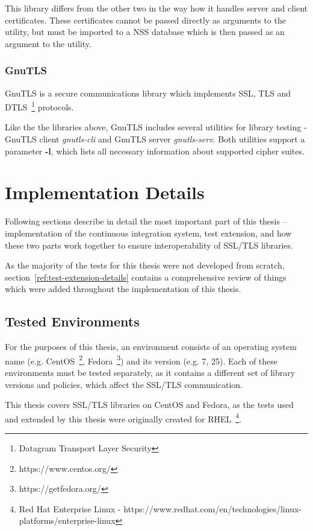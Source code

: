     This library differs from the other two in the way how it handles
    server and client certificates. These certificates cannot be passed
    directly as arguments to the utility, but must be imported to a NSS
    database which is then passed as an argument to the utility.

\subsection{GnuTLS}
    GnuTLS is a secure communications library which implements SSL, TLS and
    DTLS~\footnote{Datagram Transport Layer Security} protocols.

    Like the the libraries above, GnuTLS includes several utilities for library
    testing - GnuTLS client \textit{gnutls-cli} and GnuTLS server
    \textit{gnutls-serv}. Both utilities support a parameter \textbf{-l},
    which lists all necessary information about supported cipher suites.


\chapter{Implementation Details}
    Following sections describe in detail the most important part of this thesis
    -- implementation of the continuous integration system, test extension,
    and how these two parts work together to ensure interoperability of
    SSL/TLS libraries.

    As the majority of the tests for this thesis were not developed from scratch,
    section~\ref{ref:test-extension-details}
    contains a comprehensive review of things which were added
    throughout the implementation of this thesis.

\section{Tested Environments}
    For the purposes of this thesis, an environment consists of an operating
    system name (e.g.
    CentOS~\footnote{https://www.centos.org/},
    Fedora~\footnote{https://getfedora.org/}) and its version
    (e.g. 7, 25). Each of these environments must be tested separately, as
    it contains a different set of library versions and policies, which
    affect the SSL/TLS communication.

    This thesis covers SSL/TLS libraries on CentOS and Fedora, as the tests used
    and extended by this thesis were originally created for
    RHEL~\footnote{Red Hat Enterprise Linux -
    https://www.redhat.com/en/technologies/linux-platforms/enterprise-linux}.

